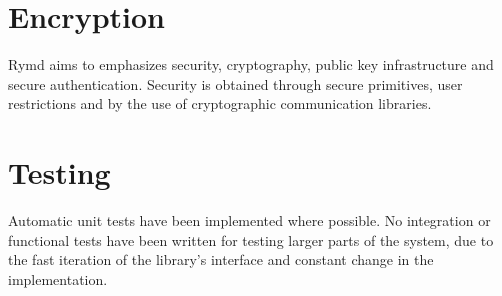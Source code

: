 \section{Encryption}
Rymd aims to emphasizes security, cryptography, public key infrastructure and secure authentication.
Security is obtained through secure primitives, user restrictions and by the use of cryptographic communication libraries.

\section{Testing}
\label{sec:testing}
Automatic unit tests have been implemented where possible. No integration or functional tests have been written for testing larger parts of the system, due to the fast iteration of the library's interface and constant change in the implementation.
